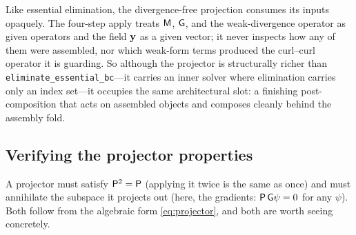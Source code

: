 \begin{remark}
Like essential elimination, the divergence-free projection consumes its inputs
opaquely. The four-step apply treats $\mathsf{M}$, $\mathsf{G}$, and the weak-divergence
operator as given operators and the field $\mathbf{y}$ as a given vector; it never inspects
how any of them were assembled, nor which weak-form terms produced the curl--curl
operator it is guarding. So although the projector is structurally richer than
\texttt{eliminate\_essential\_bc}---it carries an inner solver where elimination
carries only an index set---it occupies the same architectural slot: a finishing
post-composition that acts on assembled objects and composes cleanly behind the
assembly fold.
\end{remark}

\subsection{Verifying the projector properties}

A projector must satisfy $\mathsf{P}^2=\mathsf{P}$ (applying it twice is the same as
once) and must annihilate the subspace it projects out (here, the gradients:
$\mathsf{P}\,\mathsf{G}\psi = 0$ for any $\psi$). Both follow from the algebraic form
\cref{eq:projector}, and both are worth seeing concretely.

